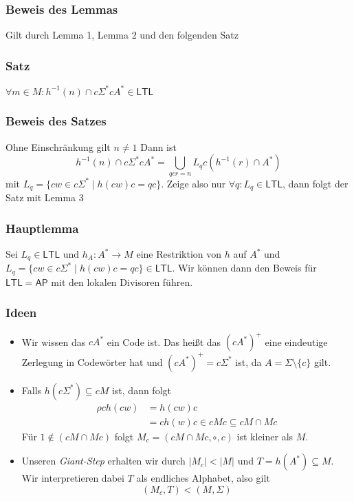 \documentclass[12pt, german]{article}
\newcommand{\sigstern}{\Sigma^\ast}
\newcommand{\inv}{^{-1}}
\newcommand{\aast}{A^{\ast}}
\newcommand{\ap}{\mathsf{AP}}
\newcommand{\ltl}{\mathsf{LTL}}
\begin{document}
\subsubsection{Beweis des Lemmas}
Gilt durch Lemma 1, Lemma 2 und den folgenden Satz

\subsubsection{Satz}
	$\forall m \in M : h\inv (n) \cap c \sigstern c \aast \in \ltl$
	
\subsubsection{Beweis des Satzes}
	Ohne Einschränkung gilt $n \not = 1$
	Dann ist $$h\inv(n) \cap c\sigstern c \aast = \bigcup_{qcr = n} L_q c (h\inv(r) \cap \aast) $$ mit $L_q = \{cw \in c \sigstern \mid h(cw)c = qc\}$. Zeige also nur $\forall q : L_q \in \ltl$, dann folgt der Satz mit Lemma 3

\subsubsection{Hauptlemma}
	Sei $L_q \in \ltl$ und $h_A: \aast \to M$ eine Restriktion von $h$ auf $\aast$ und $L_q = \{cw \in c \sigstern \mid h(cw)c = qc\} \in \ltl$. 
	Wir können dann den Beweis für $\ltl = \ap$ mit den lokalen Divisoren führen. 


\subsubsection{Ideen}
\begin{itemize}
	\item Wir wissen das $c\aast$ ein Code ist. Das heißt das $(c\aast)^+$ eine eindeutige Zerlegung in Codewörter hat und $(c\aast)^+ = c\sigstern$ ist, da $A = \Sigma \setminus \{c\}$ gilt. 
	
	\item Falls $h(c\sigstern) \subseteq cM$ ist, dann folgt 
	\begin{align*}
		\rho c h(cw) &= h(cw)c \\ 
		&= ch(w)c \in cMc \subseteq cM \cap Mc
	\end{align*}
	Für $1 \not \in (cM \cap Mc)$ folgt $M_c = (cM \cap Mc, \circ, c)$ ist kleiner als $M$. 
	\item Unseren \textit{Giant-Step} erhalten wir durch $|M_c|<|M|$ und $T= h(\aast) \subseteq M$. Wir interpretieren dabei $T$ als endliches Alphabet, also gilt 
	$$(M_c, T) <(M, \Sigma)$$
\end{itemize}
\end{document}

